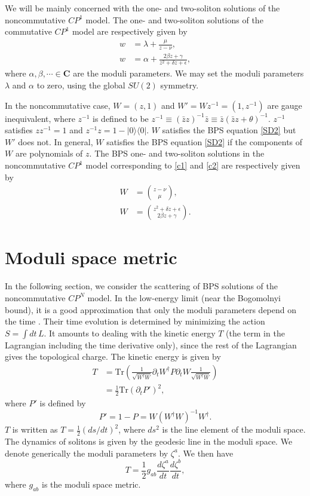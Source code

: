 \documentclass[a4paper,12pt]{article}
\begin{document}
We will be mainly concerned with the one- and two-soliton solutions 
of the noncommutative $CP^1$ model.
The one- and two-soliton solutions of the commutative $CP^1$ model are respectively given by 
\cite{Ward,Leese}
\begin{align}
w&=\lambda+\frac{\mu}{z-\nu},\label{c1}\\
w&=\alpha+\frac{2\beta z+\gamma}{z^2+\delta z+\epsilon},\label{c2}
\end{align}
where $\alpha,\beta,\cdots \in \boldsymbol{C}$ are the moduli parameters.
We may set the moduli parameters $\lambda$ and $\alpha$ to zero, using the global 
$SU(2)$ symmetry. 

In the noncommutative case, $W=(z,1)$ and $W'=Wz^{-1}=(1,z^{-1})$ are gauge inequivalent, 
where $z^{-1}$ is defined to be 
$z^{-1}\equiv(\bar{z}z)^{-1}\bar{z}\equiv\bar{z}(\bar{z}z+\theta)^{-1}$.
$z^{-1}$ satisfies $z z^{-1}=1$ and $z^{-1} z = 1- |0\rangle \langle 0|$.
$W$ satisfies the BPS equation \eqref{SD2} but $W'$ does not. 
In general, $W$ satisfies the BPS equation \eqref{SD2} 
if the components of $W$ are polynomials of $z$.
The BPS one- and two-soliton solutions in the noncommutative $CP^1$ model
corresponding to \eqref{c1} and \eqref{c2} are respectively given by
\begin{align}
W&=\binom{z-\nu}{\mu},\label{W1}\\
W&=\binom{z^2+\delta z+\epsilon}{2\beta z+\gamma}.
\end{align}

\section{Moduli space metric}
In the following section, we consider the scattering of BPS solutions of the noncommutative $CP^N$ model.
In the low-energy limit (near the Bogomolnyi bound), it is a good approximation that only the moduli parameters 
depend on the time \cite{Manton}. Their time evolution is determined by minimizing the action $S=\int\!dt\,L$.
It amounts to dealing with the kinetic energy $T$ (the term in the Lagrangian including the time derivative only), 
since the rest of the Lagrangian gives the topological charge.
The kinetic energy is given by
\begin{equation}
\begin{split}\label{T}
T&=\mbox{Tr}\left(\frac{1}{\sqrt{W^\dag W}}\partial_t W^\dag P\partial_t W\frac{1}{\sqrt{W^\dag W}}\right)\\
&=\frac{1}{2}\mbox{Tr}(\partial_t P')^2,
\end{split}
\end{equation}
where $P'$ is defined by
\begin{equation}
P'=1-P=W(W^\dag W)^{-1}W^\dag.
\end{equation}
$T$ is written as $T=\frac{1}{2}(ds/dt)^2$, where $ds^2$ is the line element of the moduli space. 
The dynamics of solitons is given by the geodesic line in the moduli space.
We denote generically the moduli parameters by $\zeta^a$. We then have
\begin{equation}
T=\frac{1}{2}g_{ab}\frac{d\zeta^a}{dt}\frac{d\zeta^b}{dt},
\end{equation}
where $g_{ab}$ is the moduli space metric.
\end{document}
